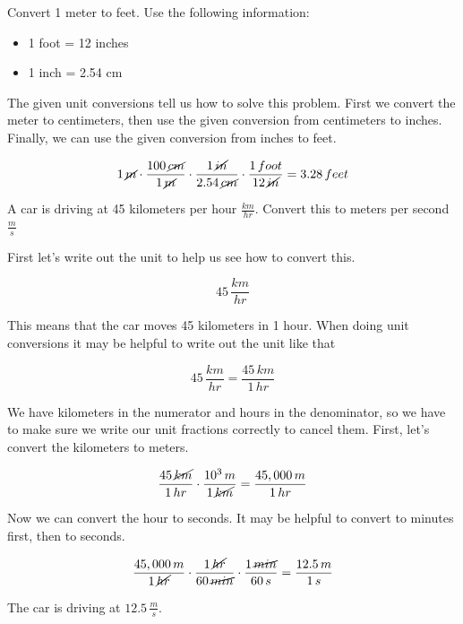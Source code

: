 \documentclass[12pt]{book}
\begin{document}
\begin{exampleblock}

Convert 1 meter to feet. Use the following information:

\begin{itemize}
\item 1 foot = 12 inches
\item 1 inch = 2.54 cm
\end{itemize}

The given unit conversions tell us how to solve this problem. First we convert the meter to centimeters, then use the given conversion from centimeters to inches. Finally, we can use the given conversion from inches to feet.

\begin{equation}
1 \, \cancel{m} \cdot \frac{100 \, \cancel{cm}}{1 \, \cancel{m}} \cdot \frac{1 \, \cancel{in}}{2.54 \, \cancel{cm}} \cdot \frac{1 \, foot}{12 \, \cancel{in}} = 3.28 \, feet
\end{equation}

\end{exampleblock}

\begin{exampleblock}

A car is driving at 45 kilometers per hour $\frac{km}{hr}$. Convert this to meters per second $\frac{m}{s}$

\hspace{10pt}

First let's write out the unit to help us see how to convert this.

\begin{equation}
45 \, \frac{km}{hr}
\end{equation}

This means that the car moves 45 kilometers in 1 hour. When doing unit conversions it may be helpful to write out the unit like that

\begin{equation}
45 \, \frac{km}{hr} = \frac{45 \, km}{1 \, hr}
\end{equation}

We have kilometers in the numerator and hours in the denominator, so we have to make sure we write our unit fractions correctly to cancel them. First, let's convert the kilometers to meters.

\begin{equation}
\frac{45 \, \cancel{km}}{1 \, hr} \cdot \frac{10^3 \, m}{1 \, \cancel{km}} = \frac{45,000 \, m}{1 \, hr}
\end{equation}

Now we can convert the hour to seconds. It may be helpful to convert to minutes first, then to seconds.

\begin{equation}
\frac{45,000 \, m}{1 \, \cancel{hr}} \cdot \frac{1 \, \cancel{hr}}{60 \, \cancel{min}} \cdot \frac{1 \, \cancel{min}}{60 \, s} = \frac{12.5 \, m}{1 \, s}
\end{equation}

The car is driving at $12.5 \, \frac{m}{s}$.

\end{exampleblock}
\end{document}
